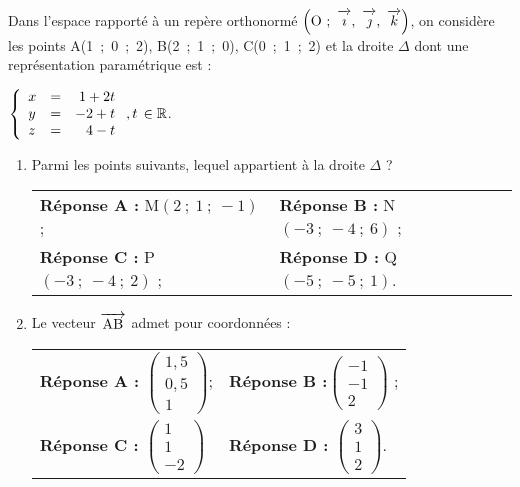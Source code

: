 \documentclass[11pt]{article}
\newcommand{\R}{\mathbb{R}}
\newcommand{\vect}[1]{\overrightarrow{\,\mathstrut#1\,}}
\def\Oijk{$\left(\text{O}~;~\vect{\imath},~\vect{\jmath},~\vect{k}\right)$}
\begin{document}
\medskip

Dans l'espace rapporté à un repère orthonormé \Oijk, on considère les points A(1~;~0~;~2), B(2~;~1~;~0), C(0~;~1~;~2) et la droite $\Delta$ dont une représentation paramétrique est :

$\left\{\begin{array}{l c r}
x &=& 1 + 2t\\
y &=& -2 + t\\ 
z&=&4 - t
\end{array}\right., t\, \in \R$.

\medskip

\begin{enumerate}
\item Parmi les points suivants, lequel appartient à la droite $\Delta$ ?
\begin{center}
\begin{tabularx}{\linewidth}{X X}
\textbf{Réponse A :} M$(2~;~1~;~-1)$; & \textbf{Réponse B :} N$(-3~;~-4~;~6)$ ;\\
\textbf{Réponse C :} P$(-3~;~-4~;~2)$ ; & \textbf{Réponse D :} Q$(-5~;~-5~;~1)$.
\end{tabularx}
\end{center}

\item Le vecteur $\vect{\text{AB}}$ admet pour coordonnées : 

\begin{center}
\begin{tabularx}{\linewidth}{X X}
\textbf{Réponse A :} $\begin{pmatrix}1,5\\0,5\\1\end{pmatrix}$;& \textbf{Réponse B :}$\begin{pmatrix}-1\\-1\\2\end{pmatrix}$ ;\\
\textbf{Réponse C :} $\begin{pmatrix}1\\1\\-2\end{pmatrix}$& \textbf{Réponse D :} $\begin{pmatrix}3\\1\\2\end{pmatrix}$.
\end{tabularx}
\end{center}


\end{enumerate}
\end{document}
